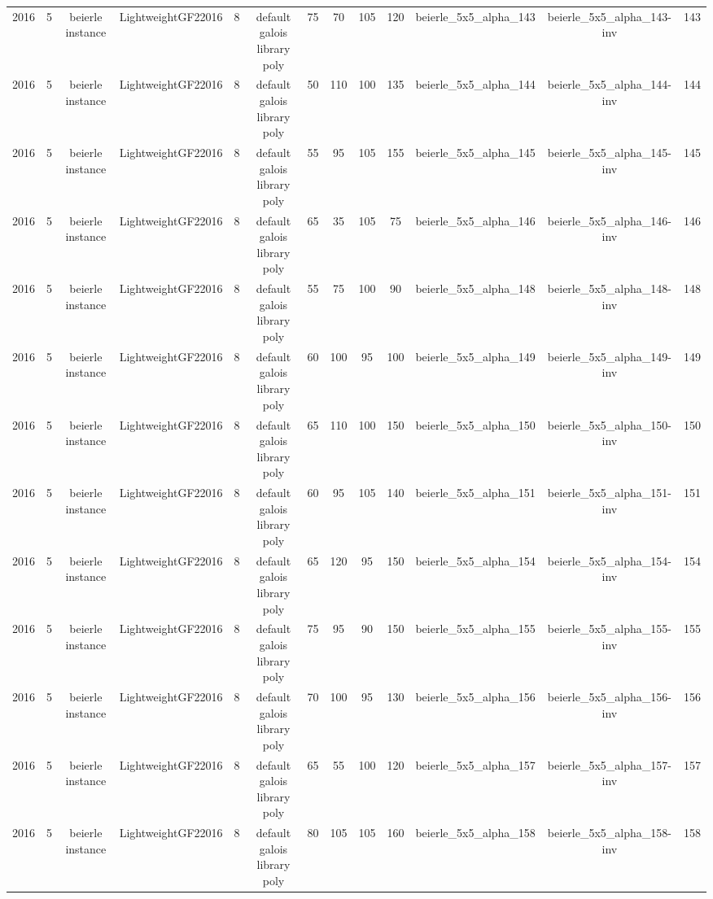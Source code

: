 \begin{tabular}{c c c c c c c c c c c c c}
2016 & 5 & beierle instance & LightweightGF22016 & 8 & default galois library poly & 75 & 70 & 105 & 120 & beierle_5x5_alpha_143 & beierle_5x5_alpha_143-inv & 143 \\
2016 & 5 & beierle instance & LightweightGF22016 & 8 & default galois library poly & 50 & 110 & 100 & 135 & beierle_5x5_alpha_144 & beierle_5x5_alpha_144-inv & 144 \\
2016 & 5 & beierle instance & LightweightGF22016 & 8 & default galois library poly & 55 & 95 & 105 & 155 & beierle_5x5_alpha_145 & beierle_5x5_alpha_145-inv & 145 \\
2016 & 5 & beierle instance & LightweightGF22016 & 8 & default galois library poly & 65 & 35 & 105 & 75 & beierle_5x5_alpha_146 & beierle_5x5_alpha_146-inv & 146 \\
2016 & 5 & beierle instance & LightweightGF22016 & 8 & default galois library poly & 55 & 75 & 100 & 90 & beierle_5x5_alpha_148 & beierle_5x5_alpha_148-inv & 148 \\
2016 & 5 & beierle instance & LightweightGF22016 & 8 & default galois library poly & 60 & 100 & 95 & 100 & beierle_5x5_alpha_149 & beierle_5x5_alpha_149-inv & 149 \\
2016 & 5 & beierle instance & LightweightGF22016 & 8 & default galois library poly & 65 & 110 & 100 & 150 & beierle_5x5_alpha_150 & beierle_5x5_alpha_150-inv & 150 \\
2016 & 5 & beierle instance & LightweightGF22016 & 8 & default galois library poly & 60 & 95 & 105 & 140 & beierle_5x5_alpha_151 & beierle_5x5_alpha_151-inv & 151 \\
2016 & 5 & beierle instance & LightweightGF22016 & 8 & default galois library poly & 65 & 120 & 95 & 150 & beierle_5x5_alpha_154 & beierle_5x5_alpha_154-inv & 154 \\
2016 & 5 & beierle instance & LightweightGF22016 & 8 & default galois library poly & 75 & 95 & 90 & 150 & beierle_5x5_alpha_155 & beierle_5x5_alpha_155-inv & 155 \\
2016 & 5 & beierle instance & LightweightGF22016 & 8 & default galois library poly & 70 & 100 & 95 & 130 & beierle_5x5_alpha_156 & beierle_5x5_alpha_156-inv & 156 \\
2016 & 5 & beierle instance & LightweightGF22016 & 8 & default galois library poly & 65 & 55 & 100 & 120 & beierle_5x5_alpha_157 & beierle_5x5_alpha_157-inv & 157 \\
2016 & 5 & beierle instance & LightweightGF22016 & 8 & default galois library poly & 80 & 105 & 105 & 160 & beierle_5x5_alpha_158 & beierle_5x5_alpha_158-inv & 158 \\

\end{tabular}
